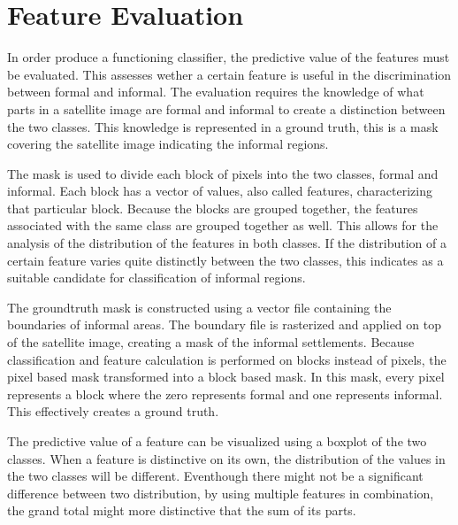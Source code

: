 
\section{Feature Evaluation}

In order produce a functioning classifier, the predictive value of the features
must be evaluated. This assesses wether a certain feature is useful in the
discrimination between formal and informal. The evaluation requires the
knowledge of what parts in a satellite image are formal and informal to create
a distinction between the two classes. This knowledge is represented in
a ground truth, this is a mask covering the satellite image indicating the
informal regions.

The mask is used to divide each block of pixels into the two classes, formal
and informal. Each block has a vector of values, also called features,
characterizing that particular block. Because the blocks are grouped together,
the features associated with the same class are grouped together as well. This
allows for the analysis of the distribution of the features in both classes. If
the distribution of a certain feature varies quite distinctly between the two
classes, this indicates as a suitable candidate for classification of informal
regions.

The groundtruth mask is constructed using a vector file containing the
boundaries of informal areas. The boundary file is rasterized and applied on
top of the satellite image, creating a mask of the informal settlements.
Because classification and feature calculation is performed on blocks instead
of pixels, the pixel based mask transformed into a block based mask. In this
mask, every pixel represents a block where the zero represents formal and one
represents informal. This effectively creates a ground truth.  

The predictive value of a feature can be visualized using a boxplot of the two
classes. When a feature is distinctive on its own, the distribution of the
values in the two classes will be different. Eventhough there might not be
a significant difference between two distribution, by using multiple features
in combination, the grand total might more distinctive that the sum of its
parts. 



